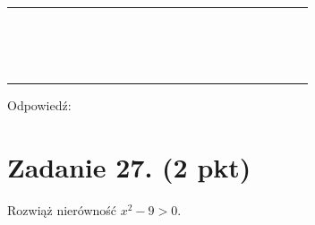 \documentclass[10pt]{article}
\begin{document}
\begin{center}
\begin{tabular}{|c|c|c|c|c|c|c|c|c|c|c|c|c|c|c|c|c|c|c|c|c|c|c|c|}
\hline
 &  &  &  &  &  &  &  &  &  &  &  &  &  &  &  &  &  &  &  &  &  &  &  \\
\hline
 &  &  &  &  &  &  &  &  &  &  &  &  &  &  &  &  &  &  &  &  &  &  &  \\
\hline
 &  &  &  &  &  &  &  &  &  &  &  &  &  &  &  &  &  &  &  &  &  &  &  \\
\hline
 &  &  &  &  &  &  &  &  &  &  &  &  &  &  &  &  &  &  &  &  &  &  &  \\
\hline
 &  &  &  &  &  &  &  &  &  &  &  &  &  &  &  &  &  &  &  &  &  &  &  \\
\hline
 &  &  &  &  &  &  &  &  &  &  &  &  &  &  &  &  &  &  &  &  &  &  &  \\
\hline
 &  &  &  &  &  &  &  &  &  &  &  &  &  &  &  &  &  &  &  &  &  &  &  \\
\hline
 &  &  &  &  &  &  &  &  &  &  &  &  &  &  &  &  &  &  &  &  &  &  &  \\
\hline
 &  &  &  &  &  &  &  &  &  &  &  &  &  &  &  &  &  &  &  &  &  &  &  \\
\hline
 &  &  &  &  &  &  &  &  &  &  &  &  &  &  &  &  &  &  &  &  &  &  &  \\
\hline
 &  &  &  &  &  &  &  &  &  &  &  &  &  &  &  &  &  &  &  &  &  &  &  \\
\hline
 &  &  &  &  &  &  &  &  &  &  &  &  &  &  &  &  &  &  &  &  &  &  &  \\
\hline
 &  &  &  &  &  &  &  &  &  &  &  &  &  &  &  &  &  &  &  &  &  &  &  \\
\hline
 &  &  &  &  &  &  &  &  &  &  &  &  &  &  &  &  &  &  &  &  &  &  &  \\
\hline
 &  &  &  &  &  &  &  &  &  &  &  &  &  &  &  &  &  &  &  &  &  &  &  \\
\hline
 &  &  &  &  &  &  &  &  &  &  &  &  &  &  &  &  &  &  &  &  &  &  &  \\
\hline
 &  &  &  &  &  &  &  &  &  &  &  &  &  &  &  &  &  &  &  &  &  &  &  \\
\hline
\end{tabular}
\end{center}

Odpowiedź: \(\qquad\)

\section*{Zadanie 27. (2 pkt)}
Rozwiąż nierówność \(x^{2}-9>0\).
\end{document}
